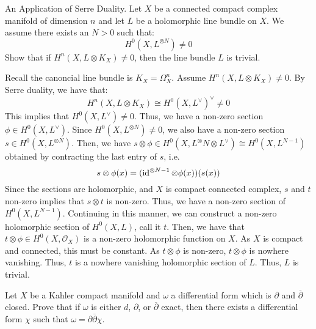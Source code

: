 \documentclass[12pt]{article}
\begin{document}
\begin{problem}{1.6}
    An Application of Serre Duality. Let $X$ be a connected compact complex manifold of dimension $n$ and let $L$ be a holomorphic line bundle on $X$. We assume there exists an $N > 0$ such that:
    \[H^0(X, L^{\otimes N}) \neq 0\]
    Show that if $H^n(X, L \otimes K_X) \neq 0$, then the line bundle $L$ is trivial. 
\end{problem}
\begin{solution}
    Recall the canoncial line bundle is $K_X = \Omega^n_X$. Assume $H^n(X, L \otimes K_X) \neq 0$. By Serre duality, we have that: 
    \[ H^n(X, L \otimes K_X) \cong H^0(X, L^\vee)^\vee \neq 0\]
    This implies that $H^0(X, L^\vee) \neq 0$. Thus, we have a non-zero section $\phi \in H^0(X, L^\vee)$. Since $H^0(X, L^{\otimes N}) \neq 0$, we also have a non-zero section $s \in H^0(X, L^{\otimes N})$. Then, we have $s \otimes \phi \in H^0(X, L^\otimes{N} \otimes L^{\vee}) \cong H^0(X, L^{N-1})$ obtained by contracting the last entry of $s$, i.e.
    \[ s \otimes \phi(x) = (\operatorname{id}^{\otimes N-1} \otimes \phi(x))(s(x))\]
    Since the sections are holomorphic, and $X$ is compact connected complex, $s$ and $t$ non-zero implies that $s \otimes t$ is non-zero. Thus, we have a non-zero section of $H^0(X, L^{N-1})$. \bbni
    Continuing in this manner, we can construct a non-zero holomorphic section of $H^0(X, L)$, call it $t$. Then, we have that $t \otimes \phi \in H^0(X, \mathcal{O}_X)$ is a non-zero holomorphic function on $X$. As $X$ is compact and connected, this must be constant. As $t \otimes \phi$ is non-zero, $t \otimes \phi$ is nowhere vanishing. Thus, $t$ is a nowhere vanishing holomorphic section of $L$. Thus, $L$ is trivial.
\end{solution}
\newpage

\begin{problem}{2}
    Let $X$ be a Kahler compact manifold and $\omega$ a differential form which is $\partial$ and $\overline{\partial}$ closed. Prove that if $\omega$ is either $d$, $\partial$, or $\overline{\partial}$ exact, then there exists a differential form $\chi$ such that $\omega = \partial \overline{\partial} \chi$.
\end{problem}
\end{document}
